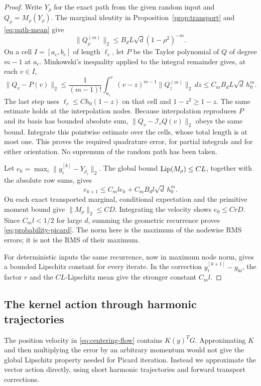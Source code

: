 \begin{proof}
Write $Y_\rho$ for the exact path from the given random input and
$Q_\rho=M_\rho(Y_\rho)$.  The marginal identity in
Proposition~\ref{prop:transport} and \eqref{eq:path-mean} give
\[
 \|Q_\rho^{(m)}\|_2\le B_dL\sqrt d(1-\rho^2)^{-m}.
\]
On a cell $I=[a_c,b_c]$ of length $\ell_c$, let $P$ be the
Taylor polynomial of $Q$ of degree $m-1$ at $a_c$.  Minkowski's
inequality applied to the integral remainder gives, at each $v\in I$,
\begin{equation}\label{eq:numerical-taylor-remainder}
 \|Q_v-P(v)\|_2
 \le \frac1{(m-1)!}\int_{a_c}^v
       (v-z)^{m-1}\|Q_z^{(m)}\|_2\,dz
 \le C_mB_dL\sqrt d\,h_0^m.
\end{equation}
The last step uses $\ell_c\le Ch_0(1-z)$ on that cell and
$1-z^2\ge1-z$.  The same estimate holds at the interpolation nodes.
Because interpolation reproduces $P$ and its basis has bounded absolute
sum, $\|Q_v-\mathcal I_cQ(v)\|_2$ obeys the same bound.
Integrate this pointwise estimate over the cells, whose total length
is at most one.  This proves the required quadrature error, for partial
integrals and for either orientation.  No supremum of the random path
has been taken.

Let $e_k=\max_i\|y_i^{[k]}-Y_{\rho_i}\|_2$.  The global bound
$\operatorname{Lip}(M_\rho)\le CL$, together with the absolute row sums, gives
\[
 e_{k+1}\le C_ml e_k+C_mB_dl\sqrt d\,h_0^m.
\]
On each exact transported marginal, conditional expectation and the
primitive moment bound give $\|M_\rho\|_2\le CD$.  Integrating the
velocity shows $e_0\le CrD$.  Since $C_ml<1/2$ for large $d$, summing
the geometric recurrence proves \eqref{eq:probability-picard}.
The norm here is the maximum of the nodewise RMS errors; it is not the
RMS of their maximum.

For deterministic inputs the same recurrence, now in maximum node norm,
gives a bounded Lipschitz constant for every iterate.  In the correction
$y_i^{[k+1]}-y_{\mathrm{in}}$, the factor $r$ and the $CL$-Lipschitz mean
give the stronger constant $C_ml$.
\end{proof}

\subsection{The kernel action through harmonic trajectories}

The position velocity in \eqref{eq:centering-flow} contains $K(y)^TG$.
Approximating $K$ and then multiplying the error by an arbitrary momentum
would not give the global Lipschitz property needed for Picard iteration.
Instead we approximate the vector action directly, using short harmonic
trajectories and forward transport corrections.

